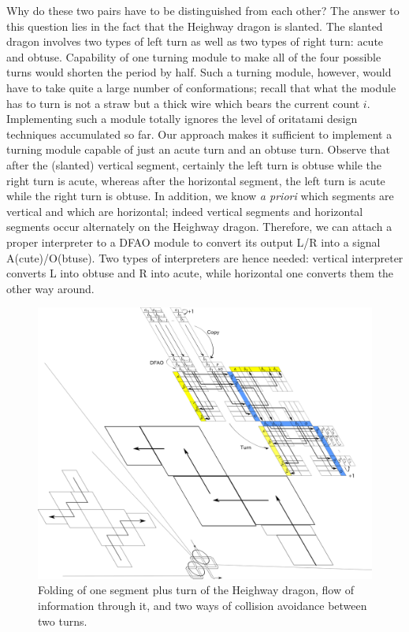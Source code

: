 Why do these two pairs have to be distinguished from each other? 
The answer to this question lies in the fact that the Heighway dragon is slanted. 
The slanted dragon involves two types of left turn as well as two types of right turn: acute and obtuse. 
Capability of one turning module to make all of the four possible turns would shorten the period by half. 
Such a turning module, however, would have to take quite a large number of conformations; recall that what the module has to turn is not a straw but a thick wire which bears the current count $i$. 
Implementing such a module totally ignores the level of oritatami design techniques accumulated so far.  
Our approach makes it sufficient to implement a turning module capable of just an acute turn and an obtuse turn. 
Observe that after the (slanted) vertical segment, certainly the left turn is obtuse while the right turn is acute, whereas after the horizontal segment, the left turn is acute while the right turn is obtuse. 
In addition, we know \textit{a priori} which segments are vertical and which are horizontal; indeed vertical segments and horizontal segments occur alternately on the Heighway dragon. 
Therefore, we can attach a proper interpreter to a DFAO module to convert its output L/R into a signal A(cute)/O(btuse). 
Two types of interpreters are hence needed: vertical interpreter converts L into obtuse and R into acute, while horizontal one converts them the other way around. 

\begin{figure}[h]
\includegraphics[width=\linewidth]{pic/dragon_vol4.pdf}
\caption{
Folding of one segment plus turn of the Heighway dragon, flow of information through it, and two ways of collision avoidance between two turns.
}
\label{fig:abst_dragon}
\end{figure}

